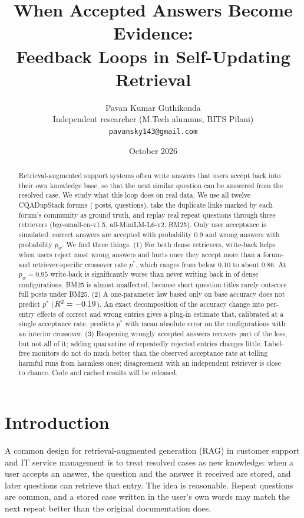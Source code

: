\documentclass[11pt]{article}
\title{When Accepted Answers Become Evidence:\\Feedback Loops in Self-Updating Retrieval}
\author{Pavan Kumar Guthikonda\\
\small Independent researcher (M.Tech alumnus, BITS Pilani)\\
\small \texttt{pavansky143@gmail.com}}
\date{October 2026}
\begin{document}
\maketitle

\begin{abstract}
Retrieval-augmented support systems often write answers that users accept back into their own knowledge base, so that the next similar question can be answered from the resolved case. We study what this loop does on real data. We use all twelve CQADupStack forums (\totKB{} posts, \totAsks{} questions), take the duplicate links marked by each forum's community as ground truth, and replay real repeat questions through three retrievers (bge-small-en-v1.5, all-MiniLM-L6-v2, BM25). Only user acceptance is simulated: correct answers are accepted with probability 0.9 and wrong answers with probability $p_w$. We find three things. (1) For both dense retrievers, write-back helps when users reject most wrong answers and hurts once they accept more than a forum- and retriever-specific crossover rate $p^*$, which ranges from below 0.10 to about 0.86. At $p_w=0.95$ write-back is significantly worse than never writing back in \negNF{} of \nDense{} dense configurations. BM25 is almost unaffected, because short question titles rarely outscore full posts under BM25. (2) A one-parameter law based only on base accuracy does not predict $p^*$ ($R^2=-0.19$). An exact decomposition of the accuracy change into per-entry effects of correct and wrong entries gives a plug-in estimate that, calibrated at a single acceptance rate, predicts $p^*$ with mean absolute error \plugMAE{} on the \plugN{} configurations with an interior crossover. (3) Reopening wrongly accepted answers recovers part of the loss, but not all of it; adding quarantine of repeatedly rejected entries changes little. Label-free monitors do not do much better than the observed acceptance rate at telling harmful runs from harmless ones; disagreement with an independent retriever is close to chance. Code and cached results will be released.
\end{abstract}

\section{Introduction}
A common design for retrieval-augmented generation (RAG) \citep{lewis2020rag} in customer support and IT service management is to treat resolved cases as new knowledge: when a user accepts an answer, the question and the answer it received are stored, and later questions can retrieve that entry. The idea is reasonable. Repeat questions are common, and a stored case written in the user's own words may match the next repeat better than the original documentation does.
\end{document}
